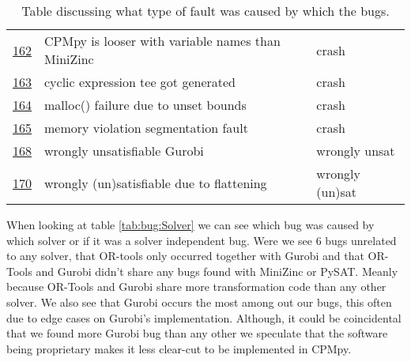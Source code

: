 \begin{table}[]
\begin{tabular}{lll}
		\href{https://github.com/CPMpy/cpmpy/issues/162}{162} & CPMpy is looser with variable names than MiniZinc & crash           \\
		\href{https://github.com/CPMpy/cpmpy/issues/163}{163} & cyclic expression tee got generated               & crash           \\
		\href{https://github.com/CPMpy/cpmpy/issues/164}{164} & malloc() failure due to unset bounds              & crash           \\
		\href{https://github.com/CPMpy/cpmpy/issues/165}{165} & memory violation segmentation fault               & crash           \\
		\href{https://github.com/CPMpy/cpmpy/issues/168}{168} & wrongly unsatisfiable Gurobi                      & wrongly unsat   \\
		\href{https://github.com/CPMpy/cpmpy/issues/170}{170} & wrongly (un)satisfiable due to flattening         & wrongly (un)sat \\ \bottomrule
	\end{tabular}
	\caption{Table discussing what type of fault was caused by which the bugs.}
	\label{tab:bug:fault}
\end{table}

When looking at table \ref{tab:bug:Solver} we can see which bug was caused by which solver or if it was a solver independent bug. Were we see 6 bugs unrelated to any solver, that OR-tools only occurred together with Gurobi and that OR-Tools and Gurobi didn't share any bugs found with MiniZinc or PySAT. Meanly because OR-Tools and Gurobi share more transformation code than any other solver. We also see that Gurobi occurs the most among out our bugs, this often due to edge cases on Gurobi's implementation. Although, it could be coincidental that we found more Gurobi bug than any other we speculate that the software being proprietary makes it less clear-cut to be implemented in CPMpy.

